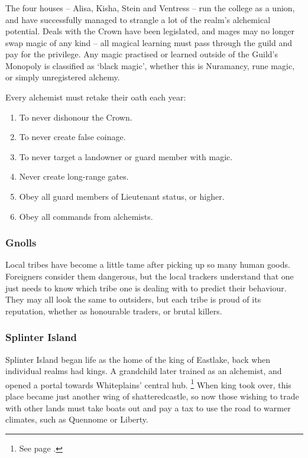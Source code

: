\begin{multicols}{2}
\subsubsection{}

The four houses -- Alisa, Kisha, Stein and Ventress -- run the college as a union, and have successfully managed to strangle a lot of the realm's alchemical potential.
Deals with the Crown have been legislated, and mages may no longer swap magic of any kind -- all magical learning must pass through the guild and pay for the privilege.
Any magic practised or learned outside of the Guild's Monopoly is classified as `black magic', whether this is Nuramancy, rune magic, or simply unregistered alchemy.

Every alchemist must retake their oath each year:

\needspace{3em}
\begin{enumerate}

  \item
  To never dishonour the Crown.
  \item
  To never create false coinage.
  \item
  To never target a landowner or \gls{guard} member with magic.
  \item
  Never create long-range gates.
  \item
  Obey all \gls{guard} members of Lieutenant status, or higher.
  \item
  Obey all commands from \gls{alchemists}.

\end{enumerate}

\subsubsection{Gnolls}

Local tribes have become a little tame after picking up so many human goods.
Foreigners consider them dangerous, but the local trackers understand that one just needs to know which tribe one is dealing with to predict their behaviour.
They may all look the same to outsiders, but each tribe is proud of its reputation, whether as honourable traders, or brutal killers.

\subsubsection{Splinter Island}

Splinter Island began life as the home of the king of Eastlake, back when individual realms had kings.
A grandchild later trained as an alchemist, and opened a portal towards Whiteplains' central hub.%
\footnote{See page \pageref{whiteland_heart}.}
When \gls{king} took over, this place became just another wing of \gls{shatteredcastle}, so now those wishing to trade with other lands must take boats out and pay a tax to use the road to warmer climates, such as Quennome or Liberty.


\end{multicols}
